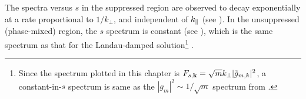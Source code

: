     The spectra versus $s$ in the suppressed region are observed to decay exponentially 
     at a rate proportional to 
    $1/k_\perp$, and independent of $k_\parallel$ (see
    ).
    In the unsuppressed (phase-mixed) region, the $s$ spectrum is constant (see
    ), which is the
    same spectrum as that for the Landau-damped solution\footnote{Since the spectrum
    plotted in this chapter is $F_{s,\mathbf{k}}=\sqrt{m}k_\perp|\tilde g_{m,k}|^2$, a constant-in-$s$ spectrum
    is same as the $|g_m|^2 \sim 1/\sqrt{m}$ spectrum from .} \cite{watanabe04, zocco11,
    hatch13, kanekar14a}.

%    
